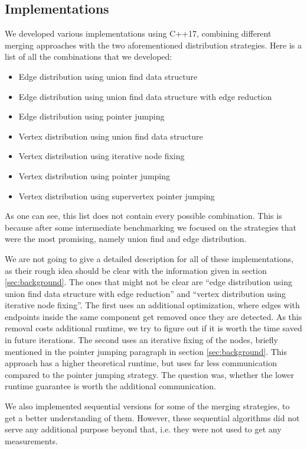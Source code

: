 \documentclass[letterpaper]{article}
\begin{document}
\subsection{Implementations}
We developed various implementations using C++17, combining different merging approaches with the two aforementioned
distribution strategies. Here is a list of all the combinations that we developed:
\begin{itemize}
  \item Edge distribution using union find data structure
  \item Edge distribution using union find data structure with edge reduction
  \item Edge distribution using pointer jumping
  \item Vertex distribution using union find data structure
  \item Vertex distribution using iterative node fixing
  \item Vertex distribution using pointer jumping
  \item Vertex distribution using supervertex pointer jumping
\end{itemize}
As one can see, this list does not contain every possible combination. This is because after some intermediate
benchmarking we focused on the strategies that were the most promising, namely union find and edge distribution.

We are not going to give a detailed description for all of these implementations, as their rough idea should be clear
with the information given in section \ref{sec:background}. The ones that might not be clear are ``edge distribution
using union find data structure with edge reduction'' and ``vertex distribution using iterative node fixing''. The first
uses an additional optimization, where edges with endpoints inside the same component get removed once they are
detected. As this removal costs additional runtime, we try to figure out if it is worth the time saved in future
iterations. The second uses an iterative fixing of the nodes, briefly mentioned in the pointer jumping paragraph in
section \ref{sec:background}. This approach has a higher theoretical runtime, but uses far less communication compared
to the pointer jumping strategy. The question was, whether the lower runtime guarantee is worth the additional
communication.

We also implemented sequential versions for some of the merging strategies, to get a better understanding of them.
However, these sequential algorithms did not serve any additional purpose beyond that, i.e. they were not used to get
any measurements.
\end{document}
